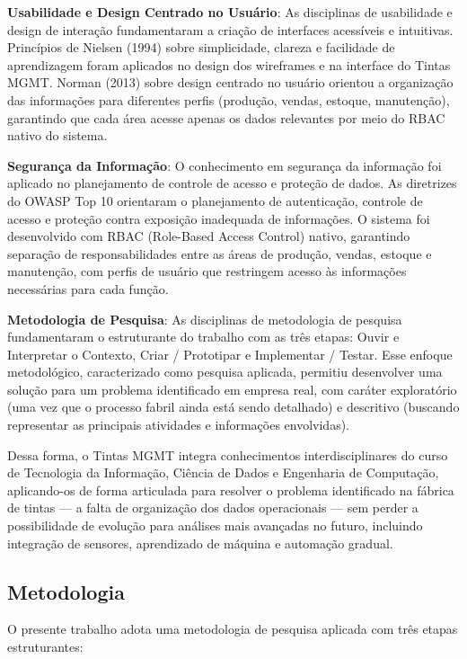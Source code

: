 \documentclass[12pt,a4paper]{article}
\begin{document}
\textbf{Usabilidade e Design Centrado no Usuário}: As disciplinas de usabilidade e design de interação fundamentaram a criação de interfaces acessíveis e intuitivas. Princípios de Nielsen (1994) sobre simplicidade, clareza e facilidade de aprendizagem foram aplicados no design dos wireframes e na interface do Tintas MGMT. Norman (2013) sobre design centrado no usuário orientou a organização das informações para diferentes perfis (produção, vendas, estoque, manutenção), garantindo que cada área acesse apenas os dados relevantes por meio do RBAC nativo do sistema.

\textbf{Segurança da Informação}: O conhecimento em segurança da informação foi aplicado no planejamento de controle de acesso e proteção de dados. As diretrizes do OWASP Top 10 orientaram o planejamento de autenticação, controle de acesso e proteção contra exposição inadequada de informações. O sistema foi desenvolvido com RBAC (Role-Based Access Control) nativo, garantindo separação de responsabilidades entre as áreas de produção, vendas, estoque e manutenção, com perfis de usuário que restringem acesso às informações necessárias para cada função.

\textbf{Metodologia de Pesquisa}: As disciplinas de metodologia de pesquisa fundamentaram o estruturante do trabalho com as três etapas: Ouvir e Interpretar o Contexto, Criar / Prototipar e Implementar / Testar. Esse enfoque metodológico, caracterizado como pesquisa aplicada, permitiu desenvolver uma solução para um problema identificado em empresa real, com caráter exploratório (uma vez que o processo fabril ainda está sendo detalhado) e descritivo (buscando representar as principais atividades e informações envolvidas).

Dessa forma, o Tintas MGMT integra conhecimentos interdisciplinares do curso de Tecnologia da Informação, Ciência de Dados e Engenharia de Computação, aplicando-os de forma articulada para resolver o problema identificado na fábrica de tintas — a falta de organização dos dados operacionais — sem perder a possibilidade de evolução para análises mais avançadas no futuro, incluindo integração de sensores, aprendizado de máquina e automação gradual.

\subsection{Metodologia}
O presente trabalho adota uma metodologia de pesquisa aplicada com três etapas estruturantes:
\end{document}
